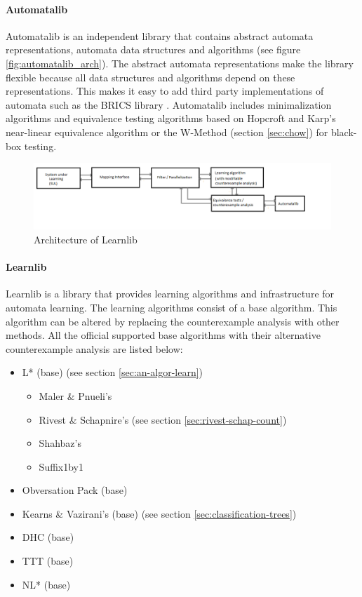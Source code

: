 \documentclass[multi,crop=false,class=article]{standalone}
\begin{document}
\paragraph{Automatalib} Automatalib is an independent library that contains
abstract automata representations, automata data structures and algorithms (see
figure \ref{fig:automatalib_arch}). The
abstract automata representations make the library flexible because all data
structures and algorithms depend on these representations. This makes it easy
to add third party implementations of automata such as the BRICS library
\cite{Alur2005}. Automatalib includes minimalization algorithms and equivalence
testing algorithms based on Hopcroft and Karp's near-linear equivalence
algorithm \cite{Hopcroft1971} or the W-Method (section \ref{sec:chow}) for
black-box testing.

\begin{figure}[!ht]
	\includegraphics[width=\textwidth]{Tool_images/learnlib_architecture.png}
	\caption{Architecture of Learnlib}
	\label{fig:learnlib_arch}
\end{figure}

\paragraph{Learnlib} Learnlib is a library that provides learning algorithms and
infrastructure for automata learning. The learning algorithms consist of a base
algorithm. This algorithm can be altered by replacing the counterexample
analysis with other methods. All the official supported base algorithms with
their alternative counterexample analysis are listed below:

\begin{itemize}
	\item L* (base) (see section \ref{sec:an-algor-learn})
	\begin{itemize}
		\item Maler \& Pnueli's \cite{Maler1995}
		\item Rivest \& Schapnire's (see section \ref{sec:rivest-schap-count})
		\item Shahbaz's \cite{Shahbaz2009}
		\item Suffix1by1 \cite{Irfan2010}
	\end{itemize}
	\item Obversation Pack (base) \cite{Howar2012a}
	\item Kearns \& Vazirani's (base) (see section
	\ref{sec:classification-trees})
	\item DHC (base) \cite{Merten2012}
	\item TTT (base) 
	\item NL* (base) \cite{Bollig2009}
\end{itemize}
\end{document}

